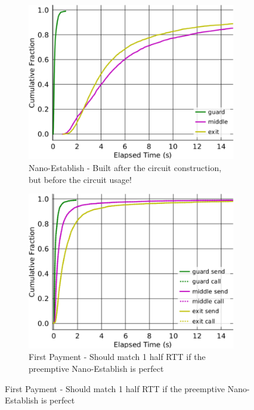 \begin{figure}[t] \centering
	\begin{subfigure}[t]{0.32\textwidth} \centering
\includegraphics[trim={0 0cm 0 0cm}, clip,
  width=1.0\textwidth]{images/payment_establish.pdf}
		\caption{Nano-Establish - Built after the circuit construction,
                  but before the circuit usage!}
\label{fig:payments_establish}
	\end{subfigure}
	\begin{subfigure}[t]{0.32\textwidth} \centering
\includegraphics[trim={0 0cm 0 0cm}, clip,
  width=1.0\textwidth]{images/payment_pay.pdf}
		\caption{First Payment - Should match 1 half RTT if the
                  preemptive Nano-Establish is perfect}

\end{subfigure}
\end{figure}
